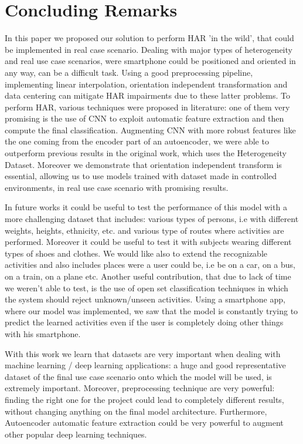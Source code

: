 
\section{Concluding Remarks}
\label{sec:concluding-remarks}

In this paper we proposed our solution to perform HAR 'in the wild', that could be implemented in real case scenario. Dealing with major types of heterogeneity and real use case scenarios, were smartphone could be positioned and oriented in any way, can be a difficult task. Using a good preprocessing pipeline, implementing linear interpolation, orientation independent transformation and data centering can mitigate HAR impairments due to these latter problems. To perform HAR, various techniques were proposed in literature: one of them very promising is the use of CNN to exploit automatic feature extraction and then compute the final classification. Augmenting CNN with more robust features like the one coming from the encoder part of an autoencoder, we were able to outperform previous results in the original work, which uses the Heterogeneity Dataset. Moreover we demonstrate that orientation independent transform is essential, allowing us to use models trained with dataset made in controlled environments, in real use case scenario with promising results. 

In future works it could be useful to test the performance of this model with a more challenging dataset that includes: various types of persons, i.e with different weights, heights, ethnicity, etc. and various type of routes where activities are performed. Moreover it could be useful to test it with subjects wearing different types of shoes and clothes. We would like also to extend the recognizable activities and also includes places were a user could be, i.e be on a car, on a bus, on a train, on a plane etc. Another useful contribution, that due to lack of time we weren't able to test, is the use of open set classification techniques in which the system should reject unknown/unseen activities. Using a smartphone app, where our model was implemented, we saw that the model is constantly trying to predict the learned activities even if the user is completely doing other things with his smartphone.

With this work we learn that datasets are very important when dealing with machine learning / deep learning applications: a huge and good representative dataset of the final use case scenario onto which the model will be used, is extremely important. Moreover, preprocessing technique are very powerful: finding the right one for the project could lead to completely different results, without changing anything on the final model architecture. Furthermore, Autoencoder automatic feature extraction could be very powerful to augment other popular deep learning techniques.

